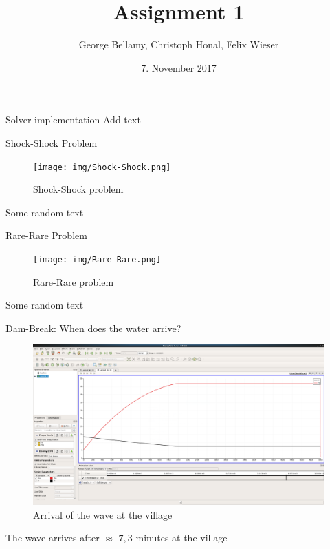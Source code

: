 \documentclass[shortpres]{beamer}
\title[{Tsunami simulation}]{Assignment 1}
\author[Bellamy Honal, Wieser]{George Bellamy, Christoph Honal, Felix Wieser\\\vspace{10pt}{\small Bachelorpraktikum}}
\institute[TU M\"unchen]{Technische Universit\"at M\"unchen}
\date{7. November 2017}
\newcommand{\imgvoffset}{-20pt}
\newcommand{\imgfullscale}{0.75}
\begin{document}
\maketitle




\begin{frame}{Solver implementation}
	Add text
\end{frame}

\begin{frame}{Shock-Shock Problem}
	\begin{figure}[t]
		\vspace{\imgvoffset}
		\texttt{[image: img/Shock-Shock.png]}
		\caption*{Shock-Shock problem}
	\end{figure}
	Some random text
\end{frame}

\begin{frame}{Rare-Rare Problem}
	\begin{figure}[t]
		\vspace{\imgvoffset}
		\texttt{[image: img/Rare-Rare.png]}
		\caption*{Rare-Rare problem}
	\end{figure}
	Some random text
\end{frame}

\begin{frame}{Dam-Break: When does the water arrive?}
	\begin{figure}[t]
		\vspace{\imgvoffset}
		\includegraphics[width=\imgfullscale\linewidth]{img/4_dorf_arrival_as_graph.png}
		\caption*{Arrival of the wave at the village}
	\end{figure}
	The wave arrives after $\approx$ $7,3$ minutes at the village
\end{frame}
\end{document}
